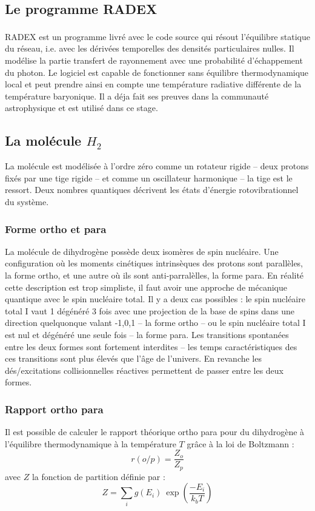 \documentclass[10pt, a4paper]{report}
\numberwithin{equation}{subsection}
\begin{document}



\subsection{Le programme RADEX}
RADEX\textsuperscript{\cite{RADEX}} est un programme livré avec le code source qui résout l'équilibre statique du réseau, i.e. avec les dérivées temporelles des densités particulaires nulles. Il modélise la partie transfert de rayonnement avec une probabilité d'échappement du photon. Le logiciel est capable de fonctionner sans équilibre thermodynamique local et peut prendre ainsi en compte une température radiative différente de la température baryonique. Il a déja fait ses preuves dans la communauté astrophysique et est utilisé dans ce stage.
\subsection{La molécule $H_2$}
La molécule est modélisée à l'ordre zéro comme un rotateur rigide -- deux protons fixés par une tige rigide -- et comme un oscillateur harmonique -- la tige est le ressort. Deux nombres quantiques décrivent les états d'énergie rotovibrationnel du système.  
\subsubsection{Forme ortho et para}
La molécule de dihydrogène possède deux isomères de spin nucléaire. Une configuration où les moments cinétiques intrinsèques des protons sont parallèles, la forme ortho, et une autre où ils sont anti-parralèlles, la forme para. En réalité cette description est trop simpliste, il faut avoir une approche de mécanique quantique avec le spin nucléaire total. Il y a deux cas possibles : le spin nucléaire total I vaut 1 dégénéré 3 fois avec une projection de la base de spins dans une direction quelquonque valant {-1,0,1} -- la forme ortho -- ou le spin nucléaire total I est nul et dégénéré une seule fois -- la forme para. Les transitions spontanées entre les deux formes sont fortement interdites -- les temps caractéristiques des ces transitions sont plus élevés que l'âge de l'univers. En revanche les dés/excitations collisionnelles réactives permettent de passer entre les deux formes. 
\subsubsection{Rapport ortho para}
Il est possible de calculer le rapport théorique ortho para pour du dihydrogène à l'équilibre thermodynamique à la température $T$ grâce à la loi de Boltzmann :
\begin{equation} \label{eq:EROP}
\boxed{r(o/p) = \frac{Z_o}{Z_p}}
\end{equation}
avec $Z$ la fonction de partition définie par :
\begin{equation} \label{eq:EZ}
 \boxed{Z = \sum\limits_i g(E_i) \ \exp\left(\frac{-E_i}{k_bT}\right)}
\end{equation}
 
\end{document}
